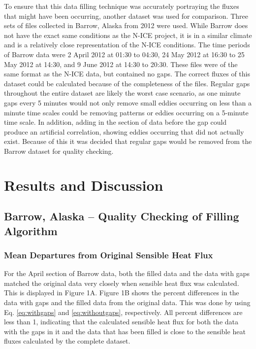 To ensure that this data filling technique was accurately portraying the fluxes that might have been occurring, another dataset was used for comparison. Three sets of files collected in Barrow, Alaska from 2012 were used. While Barrow does not have the exact same conditions as the N-ICE project, it is in a similar climate and is a relatively close representation of the N-ICE conditions. The time periods of Barrow data were 2 April 2012 at 01:30 to 04:30, 24 May 2012 at 16:30 to 25 May 2012 at 14:30, and 9 June 2012 at 14:30 to 20:30. These files were of the same format as the N-ICE data, but contained no gaps.  The correct fluxes of this dataset could be calculated because of the completeness of the files. Regular gaps throughout the entire dataset are likely the worst case scenario, as one minute gaps every 5 minutes would not only remove small eddies occurring on less than a minute time scales could be removing patterns or eddies occurring on a 5-minute time scale. In addition, adding in the section of data before the gap could produce an artificial correlation, showing eddies occurring that did not actually exist. Because of this it was decided that regular gaps would be removed from the Barrow dataset for quality checking. 

\section{Results and Discussion}
\subsection{Barrow, Alaska – Quality Checking of Filling Algorithm}
\subsubsection{Mean Departures from Original Sensible Heat Flux}

For the April section of Barrow data, both the filled data and the data with gaps matched the original data very closely when sensible heat flux was calculated. This is displayed in Figure 1A. Figure 1B shows the percent differences in the data with gaps and the filled data from the original data. This was done by using Eq. \ref{eq:withgaps} and \ref{eq:withoutgaps}, respectively. All percent differences are less than 1, indicating that the calculated sensible heat flux for both the data with the gaps in it and the data that has been filled is close to the sensible heat fluxes calculated by the complete dataset.

